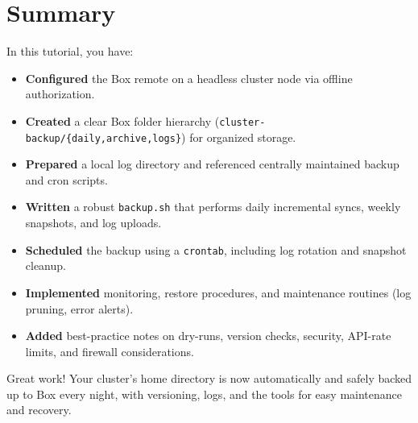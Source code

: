 \documentclass[12pt,letterpaper]{article}
\begin{document}
\section{Summary}
In this tutorial, you have:
\begin{itemize}
  \item \textbf{Configured} the Box remote on a headless cluster node via offline authorization.
  \item \textbf{Created} a clear Box folder hierarchy (\texttt{cluster-backup/\{daily,archive,logs\}}) for organized storage.
  \item \textbf{Prepared} a local log directory and referenced centrally maintained backup and cron scripts.
  \item \textbf{Written} a robust \texttt{backup.sh} that performs daily incremental syncs, weekly snapshots, and log uploads.
  \item \textbf{Scheduled} the backup using a \texttt{crontab}, including log rotation and snapshot cleanup.
  \item \textbf{Implemented} monitoring, restore procedures, and maintenance routines (log pruning, error alerts).
  \item \textbf{Added} best-practice notes on dry-runs, version checks, security, API-rate limits, and firewall considerations.
\end{itemize}

Great work! Your cluster’s home directory is now automatically and safely backed up to Box every night, with versioning, logs, and the tools for easy maintenance and recovery.
\end{document}
